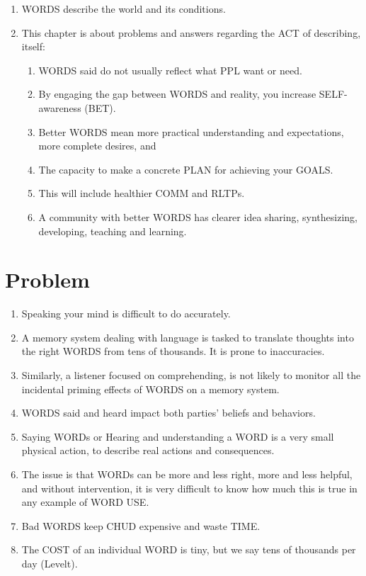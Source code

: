 \documentclass[
]{book}
\providecommand{\tightlist}{%
  \setlength{\itemsep}{0pt}\setlength{\parskip}{0pt}}
\begin{document}
\begin{enumerate}
\def\labelenumi{\arabic{enumi}.}
\tightlist
\item
  WORDS describe the world and its conditions.
\item
  This chapter is about problems and answers regarding the ACT of
  describing, itself:

  \begin{enumerate}
  \def\labelenumii{\arabic{enumii}.}
  \tightlist
  \item
    WORDS said do not usually reflect what PPL want or need.
  \item
    By engaging the gap between WORDS and reality, you increase
    SELF-awareness (BET).
  \item
    Better WORDS mean more practical understanding and expectations,
    more complete desires, and
  \item
    The capacity to make a concrete PLAN for achieving your GOALS.
  \item
    This will include healthier COMM and RLTPs.
  \item
    A community with better WORDS has clearer idea sharing,
    synthesizing, developing, teaching and learning.
  \end{enumerate}
\end{enumerate}

\hypertarget{problem}{%
\section{Problem}\label{problem}}

\begin{enumerate}
\def\labelenumi{\arabic{enumi}.}
\setcounter{enumi}{2}
\tightlist
\item
  Speaking your mind is difficult to do accurately.
\item
  A memory system dealing with language is tasked to translate
  thoughts into the right WORDS from tens of thousands. It is prone to
  inaccuracies.
\item
  Similarly, a listener focused on comprehending, is not likely to
  monitor all the incidental priming effects of WORDS on a memory
  system.
\item
  WORDS said and heard impact both parties' beliefs and behaviors.
\item
  Saying WORDs or Hearing and understanding a WORD is a very small
  physical action, to describe real actions and consequences.
\item
  The issue is that WORDs can be more and less right, more and less
  helpful, and without intervention, it is very difficult to know how
  much this is true in any example of WORD USE.
\item
  Bad WORDS keep CHUD expensive and waste TIME.
\item
  The COST of an individual WORD is tiny, but we say tens of thousands
  per day (Levelt).
\end{enumerate}
\end{document}
